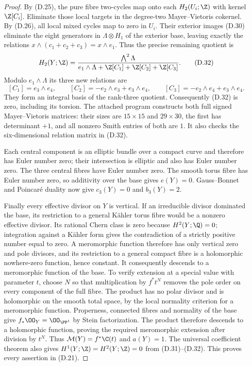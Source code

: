 \begin{proof}
By (D.25), the pure fibre two-cycles map onto each
$H_2(U_i;\Z)$ with kernel $\Z[C_i]$. Eliminate those
local targets in the degree-two Mayer--Vietoris cokernel.
By (D.26), all local mixed cycles map to zero in $U_i$.
Their exterior images (D.30) eliminate the eight
generators in $\Lambda\otimes H_1$ of the exterior base,
leaving exactly the relations
$x\wedge(c_1+c_2+c_3)=x\wedge e_1$. Thus the precise
remaining quotient is
\[
 H_2(Y;\Z)=
 \frac{\bigwedge^2\Lambda}
 {e_1\wedge\Lambda+\Z[C_1]+\Z[C_2]+\Z[C_3]}.
\tag{D.32}
\]
Modulo $e_1\wedge\Lambda$ its three new relations are
\[
 [C_1]=e_3\wedge e_4,\qquad
 [C_2]=-e_2\wedge e_3+e_3\wedge e_4,\qquad
 [C_3]=-e_2\wedge e_4+e_3\wedge e_4.
\]
They form an integral basis of the rank-three quotient.
Consequently (D.32) is zero, including its torsion.
The attached program constructs both full signed
Mayer--Vietoris matrices: their sizes are $15\times15$
and $29\times30$, the first has determinant $+1$, and
all nonzero Smith entries of both are $1$. It also checks
the six-dimensional relation matrix in (D.32).

Each central component is an elliptic bundle over a
compact curve and therefore has Euler number zero; their
intersection is elliptic and also has Euler number zero.
The three central fibres have Euler number zero. The
smooth torus fibre has Euler number zero, so additivity
over the base gives $e(Y)=0$. Gauss--Bonnet and Poincar\'e
duality now give $c_3(Y)=0$ and $b_3(Y)=2$.

Finally every effective divisor on $Y$ is vertical. If an
irreducible divisor dominated the base, its restriction
to a general K\"ahler torus fibre would be a nonzero
effective divisor. Its rational Chern class is zero
because $H^2(Y;\Q)=0$; integration against a K\"ahler
form gives the contradiction of a strictly positive
number equal to zero. A meromorphic function therefore
has only vertical zero and pole divisors, and its
restriction to a general compact fibre is a holomorphic
nowhere-zero function, hence constant. It consequently
descends to a meromorphic function of the base. To verify
extension at a special value with parameter $t$, choose
$N$ so that multiplication by $f^*t^N$ removes the pole
order on every component of the full fibre. The product
has no polar divisor and is holomorphic on the smooth
total space, by the local normality criterion for a
meromorphic function. Properness, connected fibres and
normality of the base give $f_*\OO_Y=\OO_{\PP^1}$ by
Stein factorization. The product therefore descends to a
holomorphic function, proving the required meromorphic
extension after division by $t^N$. Thus
$\mathcal M(Y)=f^*\C(t)$ and $a(Y)=1$.
The universal coefficient theorem also gives
$H^1(Y;\Z)=H^2(Y;\Z)=0$ from (D.31)--(D.32).
This proves every assertion in (D.21).
\end{proof}

